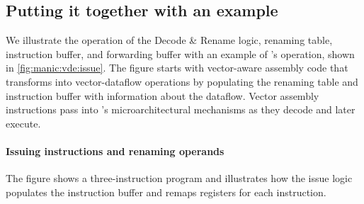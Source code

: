 \subsection{Putting it together with an example}
We illustrate the operation of the Decode \& Rename logic, renaming table, instruction
buffer, and forwarding buffer with an example of \manic's operation, shown in
\autoref{fig:manic:vde:issue}. 
%
The figure starts with vector-aware assembly code that \manic transforms into
vector-dataflow operations by populating the renaming table and instruction
buffer with information about the dataflow.
%
Vector assembly instructions pass into \manic's microarchitectural mechanisms
as they decode and later execute.
%

\figMANICMANICa

\paragraph{Issuing instructions and renaming operands}
The figure shows a three-instruction program and illustrates how
the issue logic populates the instruction buffer and remaps registers for each
instruction.

